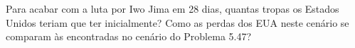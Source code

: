 Para acabar com a luta por Iwo Jima em 28 dias, quantas tropas os Estados Unidos teriam que ter inicialmente? Como as perdas dos EUA neste cenário se comparam às encontradas no cenário do Problema 5.47?
